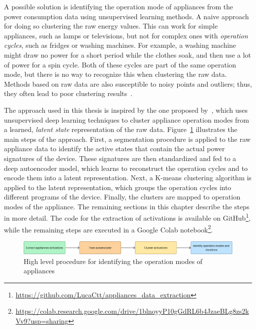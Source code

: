 A possible solution is identifying the operation mode of appliances from the power consumption data using unsupervised learning methods. A naive approach for doing so clustering the raw energy values. This can work for simple appliances, such as lamps or televisions, but not for complex ones with \textit{operation cycles}, such as fridges or washing machines. For example, a washing machine might draw no power for a short period while the clothes soak, and then use a lot of power for a spin cycle. Both of these cycles are part of the same operation mode, but there is no way to recognize this when clustering the raw data. Methods based on raw data are also susceptible to noisy points and outliers; thus, they often lead to poor clustering results~\parencite{castangia_clustering_2023}.

The approach used in this thesis is inspired by the one proposed by~\parencite{castangia_clustering_2023}, which uses unsupervised deep learning techniques to cluster appliance operation modes from a learned, \textit{latent state} representation of the raw data. Figure~\ref{fig:high_level_procedure} illustrates the main steps of the approach. First, a segmentation procedure is applied to the raw appliance data to identify the active states that contain the actual power signatures of the device. These signatures are then standardized and fed to a deep autoencoder model, which learns to reconstruct the operation cycles and to encode them into a latent representation. Next, a K-means clustering algorithm is applied to the latent representation, which groups the operation cycles into different programs of the device. Finally, the clusters are mapped to operation modes of the appliance. The remaining sections in this chapter describe the steps in more detail. The code for the extraction of activations is available on GitHub\footnote{\url{https://github.com/LucaCtt/appliances_data_extraction}}, while the remaining steps are executed in a Google Colab notebook\footnote{\url{https://colab.research.google.com/drive/1blnoyyP10gGdRL6b4JzaeBLg8zs2kVv9?usp=sharing}}.

\begin{figure}
    \centering
    \includegraphics[width=\linewidth]{images/high_level_procedure.png}
    \caption{High level procedure for identifying the operation modes of appliances}
    \label{fig:high_level_procedure}
\end{figure}

